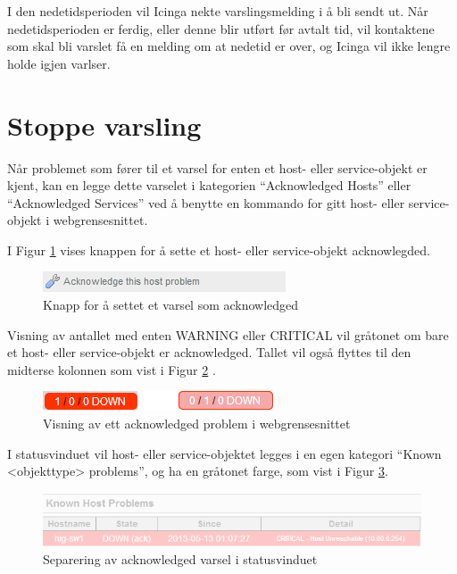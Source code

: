 	I den nedetidsperioden vil Icinga nekte varslingsmelding i å bli sendt ut. Når nedetidsperioden er ferdig, eller denne blir utført før avtalt tid, vil kontaktene som skal bli varslet få en melding om at nedetid er over, og Icinga vil ikke lengre holde igjen varlser.

\section{Stoppe varsling}
Når problemet som fører til et varsel for enten et host- eller service-objekt er kjent, kan en legge dette varselet i kategorien ``Acknowledged Hosts'' eller
``Acknowledged Services'' ved å benytte en kommando for gitt host- eller service-objekt i webgrensesnittet.

I Figur \ref{ackbutton} vises knappen for å sette et host- eller service-objekt acknowlegded.

	\begin{figure}[H]
	    \centering
	    \includegraphics{img/ack_button}
	    \caption{Knapp for å settet et varsel som acknowledged}
	    \label{ackbutton}
	\end{figure}

Visning av antallet med enten WARNING eller CRITICAL vil gråtonet om bare et host- eller service-objekt er acknowledged. Tallet vil også flyttes til den midterse kolonnen som vist i Figur \ref{ackcombined} .

	\begin{figure}[H]
	    \centering
	    \includegraphics{img/ack_combined}
	    \caption{Visning av ett acknowledged problem i webgrensesnittet}
	    \label{ackcombined}
	\end{figure}

I statusvinduet vil host- eller service-objektet legges i en egen kategori ``Known <objekttype> problems'', og ha en gråtonet farge, som vist i Figur \ref{ackstatusvindu}.

	\begin{figure}[H]
	    \centering
	    \includegraphics{img/ack_statusvindu}
	    \caption{Separering av acknowledged varsel i statusvinduet}
	    \label{ackstatusvindu}
	\end{figure}


